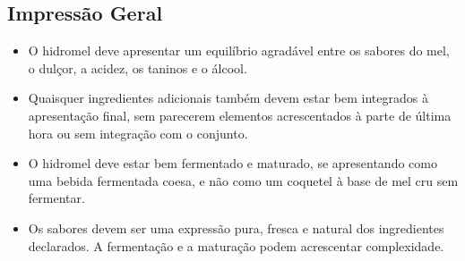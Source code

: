 \subsection*{Impressão Geral}

\begin{itemize}
\item O hidromel deve apresentar um equilíbrio agradável entre os sabores do mel, o dulçor, a acidez, os taninos e o álcool.
\item Quaisquer ingredientes adicionais também devem estar bem integrados à apresentação final, sem parecerem elementos acrescentados à parte de última hora ou sem integração com o conjunto.
\item O hidromel deve estar bem fermentado e maturado, se apresentando como uma bebida fermentada coesa, e não como um coquetel à base de mel cru sem fermentar.
\item Os sabores devem ser uma expressão pura, fresca e natural dos ingredientes declarados. A fermentação e a maturação podem acrescentar complexidade.
\end{itemize}
